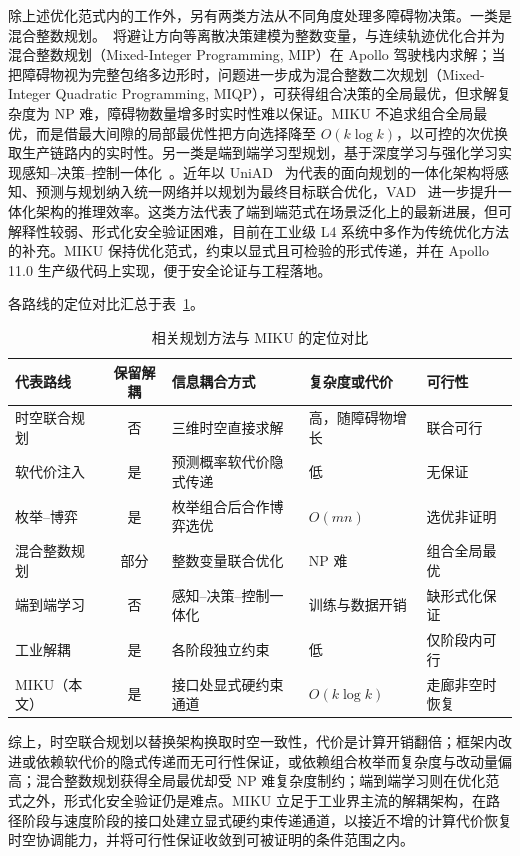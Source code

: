\documentclass[a4paper,11pt]{ctexart}
\theoremstyle{definition}
\begin{document}
除上述优化范式内的工作外，另有两类方法从不同角度处理多障碍物决策。一类是混合整数规划。\citet{kessler2023}~将避让方向等离散决策建模为整数变量，与连续轨迹优化合并为混合整数规划（Mixed-Integer Programming, MIP）在 Apollo 驾驶栈内求解；当把障碍物视为完整包络多边形时，问题进一步成为混合整数二次规划（Mixed-Integer Quadratic Programming, MIQP），可获得组合决策的全局最优，但求解复杂度为 NP 难，障碍物数量增多时实时性难以保证。MIKU 不追求组合全局最优，而是借最大间隙的局部最优性把方向选择降至 $O(k\log k)$，以可控的次优换取生产链路内的实时性。另一类是端到端学习型规划，基于深度学习与强化学习实现感知--决策--控制一体化~\citep{li2024decision,zhang2018autonomous}。近年以 UniAD~\citep{hu2023uniad} 为代表的面向规划的一体化架构将感知、预测与规划纳入统一网络并以规划为最终目标联合优化，VAD~\citep{jiang2023vad} 进一步提升一体化架构的推理效率。这类方法代表了端到端范式在场景泛化上的最新进展，但可解释性较弱、形式化安全验证困难，目前在工业级 L4 系统中多作为传统优化方法的补充。MIKU 保持优化范式，约束以显式且可检验的形式传递，并在 Apollo 11.0 生产级代码上实现，便于安全论证与工程落地。

各路线的定位对比汇总于表~\ref{tab:related}。

\begin{table}[t]
\centering
\footnotesize
\setlength{\tabcolsep}{4pt}
\caption{相关规划方法与 MIKU 的定位对比}
\label{tab:related}
\begin{tabular}{@{}lcp{3.0cm}p{2.6cm}p{2.8cm}@{}}
\toprule
代表路线 & 保留解耦 & 信息耦合方式 & 复杂度或代价 & 可行性 \\
\midrule
时空联合规划 & 否 & 三维时空直接求解 & 高，随障碍物增长 & 联合可行 \\
软代价注入 & 是 & 预测概率软代价隐式传递 & 低 & 无保证 \\
枚举--博弈 & 是 & 枚举组合后合作博弈选优 & $O(mn)$ & 选优非证明 \\
混合整数规划 & 部分 & 整数变量联合优化 & NP 难 & 组合全局最优 \\
端到端学习 & 否 & 感知--决策--控制一体化 & 训练与数据开销 & 缺形式化保证 \\
工业解耦 & 是 & 各阶段独立约束 & 低 & 仅阶段内可行 \\
MIKU（本文） & 是 & 接口处显式硬约束通道 & $O(k\log k)$ & 走廊非空时恢复 \\
\bottomrule
\end{tabular}
\end{table}

综上，时空联合规划以替换架构换取时空一致性，代价是计算开销翻倍；框架内改进或依赖软代价的隐式传递而无可行性保证，或依赖组合枚举而复杂度与改动量偏高；混合整数规划获得全局最优却受 NP 难复杂度制约；端到端学习则在优化范式之外，形式化安全验证仍是难点。MIKU 立足于工业界主流的解耦架构，在路径阶段与速度阶段的接口处建立显式硬约束传递通道，以接近不增的计算代价恢复时空协调能力，并将可行性保证收敛到可被证明的条件范围之内。
\end{document}
